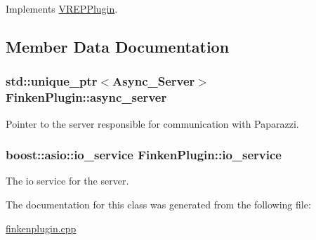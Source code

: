 Implements \hyperlink{classVREPPlugin_ae5e6764e97874aa134447122bbadbf2a}{V\+R\+E\+P\+Plugin}.



\subsection{Member Data Documentation}
\subsubsection[{\texorpdfstring{async\+\_\+server}{async_server}}]{\setlength{\rightskip}{0pt plus 5cm}std\+::unique\+\_\+ptr$<${\bf Async\+\_\+\+Server}$>$ Finken\+Plugin\+::async\+\_\+server}\hypertarget{classFinkenPlugin_aeb198541b548eb5b1ba09221aaa35a26}{}\label{classFinkenPlugin_aeb198541b548eb5b1ba09221aaa35a26}


Pointer to the server responsible for communication with Paparazzi. 

\subsubsection[{\texorpdfstring{io\+\_\+service}{io_service}}]{\setlength{\rightskip}{0pt plus 5cm}boost\+::asio\+::io\+\_\+service Finken\+Plugin\+::io\+\_\+service}\hypertarget{classFinkenPlugin_a895a0de924a1c60e3cb65ff1cf139fdc}{}\label{classFinkenPlugin_a895a0de924a1c60e3cb65ff1cf139fdc}


The io service for the server. 



The documentation for this class was generated from the following file\+:\begin{DoxyCompactItemize}
\item 
\hyperlink{finkenplugin_8cpp}{finkenplugin.\+cpp}\end{DoxyCompactItemize}

